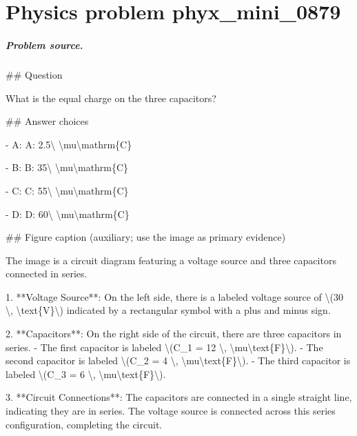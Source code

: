 
\chapter{Physics problem phyx\_mini\_0879}
\label{ch:PhyXMiniProblems_problem_phyx_mini_0879}

\paragraph{Problem source.}
\#\# Question

What is the equal charge on the three capacitors?

\#\# Answer choices

- A: A: 2.5\textbackslash{} \textbackslash{}mu\textbackslash{}mathrm\{C\}

- B: B: 35\textbackslash{} \textbackslash{}mu\textbackslash{}mathrm\{C\}

- C: C: 55\textbackslash{} \textbackslash{}mu\textbackslash{}mathrm\{C\}

- D: D: 60\textbackslash{} \textbackslash{}mu\textbackslash{}mathrm\{C\}

\#\# Figure caption (auxiliary; use the image as primary evidence)

The image is a circuit diagram featuring a voltage source and three capacitors connected in series.

1. **Voltage Source**: On the left side, there is a labeled voltage source of \textbackslash{}(30 \textbackslash{}, \textbackslash{}text\{V\}\textbackslash{}) indicated by a rectangular symbol with a plus and minus sign.

2. **Capacitors**: On the right side of the circuit, there are three capacitors in series. 
   - The first capacitor is labeled \textbackslash{}(C\_1 = 12 \textbackslash{}, \textbackslash{}mu\textbackslash{}text\{F\}\textbackslash{}).
   - The second capacitor is labeled \textbackslash{}(C\_2 = 4 \textbackslash{}, \textbackslash{}mu\textbackslash{}text\{F\}\textbackslash{}).
   - The third capacitor is labeled \textbackslash{}(C\_3 = 6 \textbackslash{}, \textbackslash{}mu\textbackslash{}text\{F\}\textbackslash{}).

3. **Circuit Connections**: The capacitors are connected in a single straight line, indicating they are in series. The voltage source is connected across this series configuration, completing the circuit.

